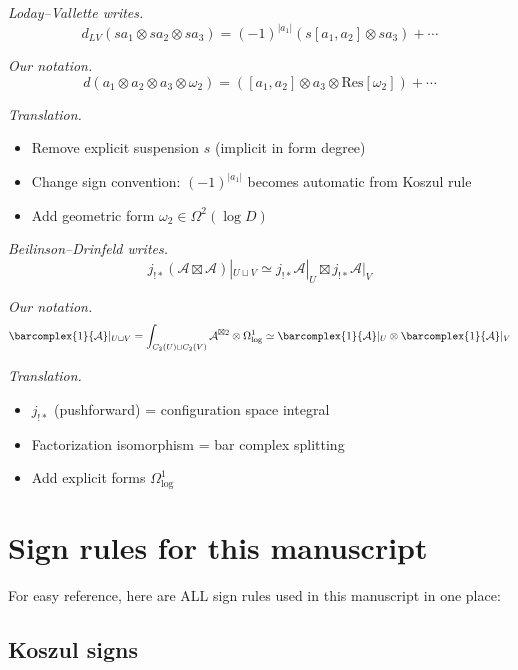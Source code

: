 \begin{example}
\emph{Loday--Vallette writes.}
\[d_{LV}(s a_1 \otimes s a_2 \otimes s a_3) = (-1)^{|a_1|} (s[a_1, a_2] \otimes s a_3) + \cdots\]

\emph{Our notation.}
\[d(a_1 \otimes a_2 \otimes a_3 \otimes \omega_2) = ([a_1, a_2] \otimes a_3 \otimes \text{Res}[\omega_2]) + \cdots\]

\emph{Translation.}
\begin{itemize}
\item Remove explicit suspension $s$ (implicit in form degree)
\item Change sign convention: $(-1)^{|a_1|}$ becomes automatic from Koszul rule
\item Add geometric form $\omega_2 \in \Omega^2(\log D)$
\end{itemize}
\end{example}

\begin{example}
\emph{Beilinson--Drinfeld writes.}
\[j_{!*}(\mathcal{A} \boxtimes \mathcal{A})|_{U \sqcup V} \simeq j_{!*}\mathcal{A}|_U \boxtimes j_{!*}\mathcal{A}|_V\]

\emph{Our notation.}
\[\barcomplex{1}{\mathcal{A}}|_{U \sqcup V} = \int_{C_2(U) \sqcup C_2(V)} \mathcal{A}^{\boxtimes 2} \otimes \Omega^1_{\log} \simeq \barcomplex{1}{\mathcal{A}}|_U \otimes \barcomplex{1}{\mathcal{A}}|_V\]

\emph{Translation.}
\begin{itemize}
\item $j_{!*}$ (pushforward) = configuration space integral
\item Factorization isomorphism = bar complex splitting
\item Add explicit forms $\Omega^1_{\log}$
\end{itemize}
\end{example}

\section{Sign rules for this manuscript}

For easy reference, here are ALL sign rules used in this manuscript in one place:

\subsection{Koszul signs}

